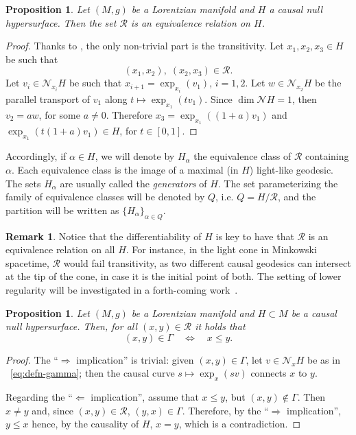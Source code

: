 \documentclass[12pt,a4paper]{amsart}
\theoremstyle{plain}
\newtheorem{proposition}[lemma]{Proposition}
\theoremstyle{definition}
\newtheorem{remark}[lemma]{Remark}
\numberwithin{equation}{section}
\newcommand{\relation}{\mathcal{R}}
\newcommand{\normal}{\mathscr{N}}
\begin{document}
\begin{proposition}
Let $(M,g)$ be a Lorentzian manifold and $H$ a causal null 
hypersurface.
%
Then the set $\relation$ is an equivalence relation on $H$.
\end{proposition}
\begin{proof}
Thanks to ,  the only non-trivial part is the transitivity.
  Let $x_1,x_2,x_3\in H$ be such that $$(x_1,x_2),\; (x_2,x_3)\in\relation.$$
  Let $v_i\in \normal_{x_{i}} H$ be such that $x_{i+1}=\exp_{x_i}(v_1)$,
  $i=1,2$.
  Let $w\in \normal_{x_2}H$ be the parallel transport of $v_1$ along
  $t\mapsto \exp_{x_1}(t v_1)$.
  Since $\dim \normal H =1$, then $v_2=a w$, for some $a\neq 0$.
  Therefore $x_3=\exp_{x_1}((1+a)v_1)$ and $\exp_{x_1}(t(1+a)v_1)\in
  H$, for $t\in[0,1]$.
\end{proof}
%
Accordingly, if $\alpha\in H$, we will denote by $H_\alpha$ the equivalence class
of $\relation$ containing $\alpha$.
%
Each equivalence class is the image of a maximal (in $H$) 
light-like geodesic. 
%
The sets $H_\alpha$ are usually called the 
\emph{generators} of $H$. The set parameterizing the family of equivalence classes will be denoted by $Q$, i.e. $Q=H \big/ \relation$, and the partition will be written as $\{H_\alpha\}_{\alpha\in Q}$. 

\begin{remark}
 Notice that the differentiability of  $H$ is key to have that $\relation$ is an equivalence
 relation on all $H$.
%
 For instance, in the light cone in Minkowski spacetime, $\relation$ would fail transitivity, as two different causal geodesics can intersect at the tip of the cone, in case it is the initial point of both.  The setting of lower regularity will be investigated in a forth-coming work~\cite{CMM24b}. \end{remark}


\begin{proposition}
\label{P:order-gamma}
Let $(M,g)$ be a Lorentzian manifold 
and $H\subset M$ be a causal null hypersurface.
%
Then, for all $(x,y)\in\relation$ it holds that
\begin{equation}
    (x,y)\in\Gamma
    \quad
    \iff
      \quad
      x\leq y      .
  \end{equation}
%
\end{proposition}

\begin{proof}
  The ``$\Longrightarrow$ implication'' is trivial: given $(x,y)\in\Gamma$, let $v\in\normal_xH$ be as in ~\eqref{eq:defn-gamma}; then the causal curve $s\mapsto \exp_x(s v)$ connects $x$ to $y$.
  
  Regarding the ``$\Longleftarrow$ implication'', assume that $x\leq y$, but
  $(x,y)\not\in\Gamma$.
  Then $x\neq y$ and, since $(x,y)\in \relation$, $(y,x)\in\Gamma$. 
  Therefore, by the ``$\Longrightarrow$ implication'', $y\leq x$ hence, by the causality of $H$, $x=y$,  which is a contradiction.
\end{proof}
\end{document}
